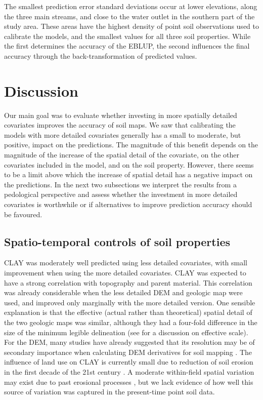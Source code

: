 The smallest prediction error standard deviations occur at lower elevations, along the three main streams, and 
close to the water outlet in the southern part of the study area. These areas have the highest density of 
point soil observations used to calibrate the models, and the smallest values for all three soil properties. 
While the first determines the accuracy of the EBLUP, the second influences the final accuracy through the 
back-transformation of predicted values.

\section{Discussion}

Our main goal was to evaluate whether investing in more spatially detailed covariates improves the accuracy of 
soil maps. We saw that calibrating the models with more detailed covariates generally has a small to moderate, 
but positive, impact on the predictions. The magnitude of this benefit depends on the magnitude of the increase 
of the spatial detail of the covariate, on the other covariates included in the model, and on the soil 
property. However, there seems to be a limit above which the increase of spatial detail has a negative impact 
on the predictions. In the next two subsections we interpret the results from a pedological perspective and 
assess whether the investment in more detailed covariates is worthwhile or if alternatives to improve 
prediction accuracy should be favoured.

\subsection{Spatio-temporal controls of soil properties}

CLAY was moderately well predicted using less detailed covariates, with small improvement when using the more 
detailed covariates. CLAY was expected to have a strong correlation with topography and parent material. This 
correlation was already considerable when the less detailed DEM and geologic map were used, and improved only 
marginally with the more detailed version. One sensible explanation is that the effective (actual rather than 
theoretical) spatial detail of the two geologic maps was similar, although they had a four-fold difference in 
the size of the minimum legible delineation (see  for a discussion on effective 
scale). For the DEM, many studies have already suggested that its resolution may be of secondary importance 
when calculating DEM derivatives for soil mapping \cite{ZhuEtAl2008, BehrensEtAl2010a, MillerEtAl2015}. The 
influence of land use on CLAY is currently small due to reduction of soil erosion in the first decade of the 
\num{21}st century \cite{MiguelEtAl2012, TenCatenEtAl2012b}. A moderate within-field spatial variation may 
exist due to past erosional processes \cite{MouraBueno2012}, but we lack evidence of how well this source of 
variation was captured in the present-time point soil data.

